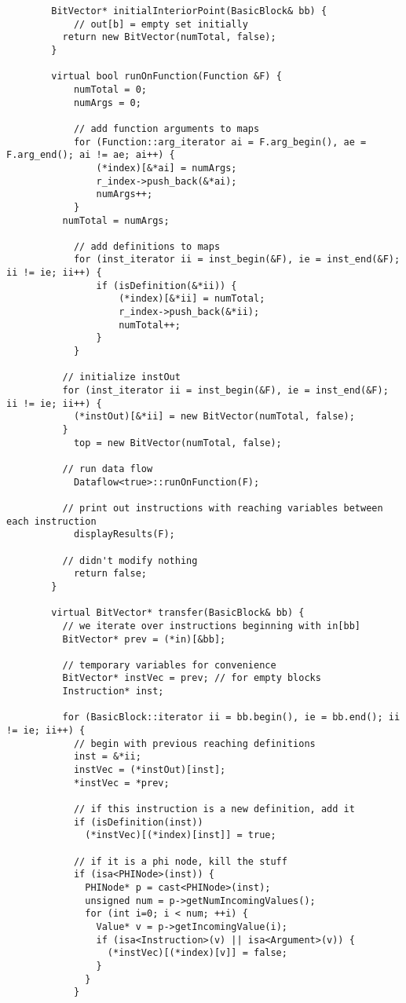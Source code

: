 \documentclass[12pt]{article}
\begin{document}
\begin{verbatim}
        BitVector* initialInteriorPoint(BasicBlock& bb) {
        	// out[b] = empty set initially
          return new BitVector(numTotal, false);
        }

        virtual bool runOnFunction(Function &F) {
        	numTotal = 0;
        	numArgs = 0;
        	
        	// add function arguments to maps
        	for (Function::arg_iterator ai = F.arg_begin(), ae = F.arg_end(); ai != ae; ai++) {
        		(*index)[&*ai] = numArgs;
        		r_index->push_back(&*ai);
        		numArgs++;
        	}
          numTotal = numArgs; 
        	
        	// add definitions to maps
        	for (inst_iterator ii = inst_begin(&F), ie = inst_end(&F); ii != ie; ii++) {
        		if (isDefinition(&*ii)) {
        			(*index)[&*ii] = numTotal;
        			r_index->push_back(&*ii);
        			numTotal++;
        		}
        	}
         
          // initialize instOut
          for (inst_iterator ii = inst_begin(&F), ie = inst_end(&F); ii != ie; ii++) {
            (*instOut)[&*ii] = new BitVector(numTotal, false);
          }
        	top = new BitVector(numTotal, false);
        	
          // run data flow 
        	Dataflow<true>::runOnFunction(F);
         
          // print out instructions with reaching variables between each instruction 
        	displayResults(F);
        	
          // didn't modify nothing 
        	return false;
        }
        
        virtual BitVector* transfer(BasicBlock& bb) {
          // we iterate over instructions beginning with in[bb]
          BitVector* prev = (*in)[&bb];
          
          // temporary variables for convenience
          BitVector* instVec = prev; // for empty blocks
          Instruction* inst;

          for (BasicBlock::iterator ii = bb.begin(), ie = bb.end(); ii != ie; ii++) {
            // begin with previous reaching definitions
            inst = &*ii;
            instVec = (*instOut)[inst];            
            *instVec = *prev;
            
            // if this instruction is a new definition, add it
            if (isDefinition(inst))
              (*instVec)[(*index)[inst]] = true;
            
            // if it is a phi node, kill the stuff
            if (isa<PHINode>(inst)) {
              PHINode* p = cast<PHINode>(inst);
              unsigned num = p->getNumIncomingValues();
              for (int i=0; i < num; ++i) {
                Value* v = p->getIncomingValue(i);
                if (isa<Instruction>(v) || isa<Argument>(v)) {
                  (*instVec)[(*index)[v]] = false;
                }
              }
            }
            

\end{verbatim}
\end{document}
